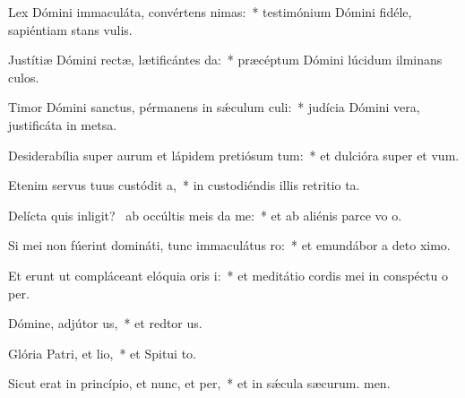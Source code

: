 \item Lex Dómini immaculáta, convértens nimas:~* testimónium Dómini fidéle, sapiéntiam stans vulis.
\item Justítiæ Dómini rectæ, lætificántes da:~* præcéptum Dómini lúcidum ilminans culos.
\item Timor Dómini sanctus, pérmanens in sǽculum culi:~* judícia Dómini vera, justificáta in metsa.
\item Desiderabília super aurum et lápidem pretiósum tum:~* et dulcióra super  et vum.
\item Etenim servus tuus custódit a,~* in custodiéndis illis retritio ta.
\item Delícta quis inligit?~\pscross{} ab occúltis meis da me:~* et ab aliénis parce vo o.
\item Si mei non fúerint domináti, tunc immaculátus ro:~* et emundábor a deto ximo.
\item Et erunt ut compláceant elóquia oris i:~* et meditátio cordis mei in conspéctu o per.
\item Dómine, adjútor us,~* et redtor us.
\item Glória Patri, et lio,~* et Spitui to.
\item Sicut erat in princípio, et nunc, et per,~* et in sǽcula sæcurum. men.
